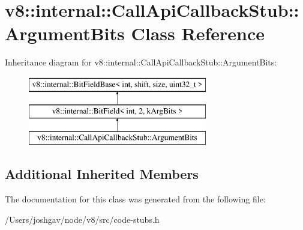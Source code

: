 \hypertarget{classv8_1_1internal_1_1_call_api_callback_stub_1_1_argument_bits}{}\section{v8\+:\+:internal\+:\+:Call\+Api\+Callback\+Stub\+:\+:Argument\+Bits Class Reference}
\label{classv8_1_1internal_1_1_call_api_callback_stub_1_1_argument_bits}
Inheritance diagram for v8\+:\+:internal\+:\+:Call\+Api\+Callback\+Stub\+:\+:Argument\+Bits\+:\begin{figure}[H]
\begin{center}
\leavevmode
\includegraphics[height=3.000000cm]{classv8_1_1internal_1_1_call_api_callback_stub_1_1_argument_bits}
\end{center}
\end{figure}
\subsection*{Additional Inherited Members}


The documentation for this class was generated from the following file\+:\begin{DoxyCompactItemize}
\item 
/\+Users/joshgav/node/v8/src/code-\/stubs.\+h\end{DoxyCompactItemize}
